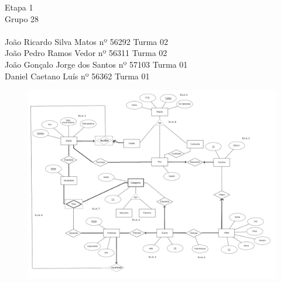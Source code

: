 \documentclass[12pt]{article}
\begin{document}
\noindent Etapa 1\\
Grupo 28\\
\\
João Ricardo Silva Matos nº 56292 Turma 02\\
João Pedro Ramos Vedor nº 56311 Turma 02\\
João Gonçalo Jorge dos Santos nº 57103 Turma 01\\
Daniel Caetano Luís nº 56362 Turma 01\\

\begin{figure}[h]
\includegraphics[scale=0.45, angle =90]{image.png}
\end{figure}



\newpage
\end{document}
